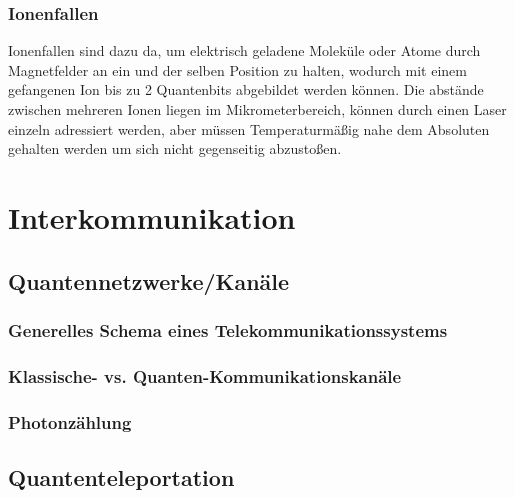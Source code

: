 \subsubsection{Ionenfallen}

Ionenfallen sind dazu da, um elektrisch geladene Moleküle oder Atome durch Magnetfelder an ein und der selben Position zu halten, wodurch mit einem gefangenen Ion bis zu 2 Quantenbits abgebildet werden können. Die abstände zwischen mehreren Ionen liegen im Mikrometerbereich, können durch einen Laser einzeln adressiert werden, aber müssen Temperaturmäßig nahe dem Absoluten gehalten werden um sich nicht gegenseitig abzustoßen.

\section{Interkommunikation}
\label{sec:Interkommunikation}


\subsection{Quantennetzwerke/Kanäle}
\label{sec:Quantennetzwerke/Kanale}

\subsubsection{Generelles Schema eines Telekommunikationssystems}

\subsubsection{Klassische- vs. Quanten-Kommunikationskan\"ale}

\subsubsection{Photonz\"ahlung}


\subsection{Quantenteleportation}
\label{sec:Quantenteleportation}






